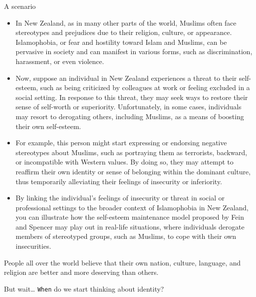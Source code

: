\documentclass[
  ignorenonframetext,
  aspectratio=169,
]{beamer}
\providecommand{\tightlist}{%
  \setlength{\itemsep}{0pt}\setlength{\parskip}{0pt}}\usepackage{longtable,booktabs,array}
\begin{document}
\begin{frame}{A scenario}
\label{a-scenario}
\begin{itemize}[<+->]
\tightlist
\item
  In New Zealand, as in many other parts of the world, Muslims often
  face stereotypes and prejudices due to their religion, culture, or
  appearance. Islamophobia, or fear and hostility toward Islam and
  Muslims, can be pervasive in society and can manifest in various
  forms, such as discrimination, harassment, or even violence.
\item
  Now, suppose an individual in New Zealand experiences a threat to
  their self-esteem, such as being criticized by colleagues at work or
  feeling excluded in a social setting. In response to this threat, they
  may seek ways to restore their sense of self-worth or superiority.
  Unfortunately, in some cases, individuals may resort to derogating
  others, including Muslims, as a means of boosting their own
  self-esteem.
\end{itemize}
\end{frame}

\begin{frame}
\begin{itemize}[<+->]
\tightlist
\item
  For example, this person might start expressing or endorsing negative
  stereotypes about Muslims, such as portraying them as terrorists,
  backward, or incompatible with Western values. By doing so, they may
  attempt to reaffirm their own identity or sense of belonging within
  the dominant culture, thus temporarily alleviating their feelings of
  insecurity or inferiority.
\item
  By linking the individual's feelings of insecurity or threat in social
  or professional settings to the broader context of Islamophobia in New
  Zealand, you can illustrate how the self-esteem maintenance model
  proposed by Fein and Spencer may play out in real-life situations,
  where individuals derogate members of stereotyped groups, such as
  Muslims, to cope with their own insecurities.
\end{itemize}
\end{frame}

\begin{frame}
People all over the world believe that their own nation, culture,
language, and religion are better and more deserving than others.
\end{frame}

\begin{frame}[fragile]
But wait\ldots{} \texttt{When} do we start thinking about identity?
\end{frame}
\end{document}
